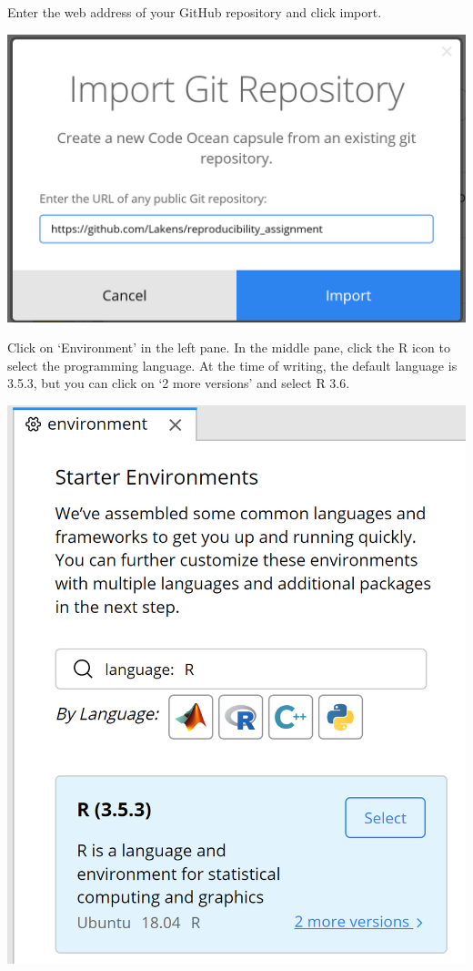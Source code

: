 \documentclass[
  oneside]{book}
\begin{document}
Enter the web address of your GitHub repository and click import.

\begin{center}\includegraphics[width=1\linewidth]{images/51f0dab67e96b317ef54a0affabe14d6} \end{center}

Click on `Environment' in the left pane. In the middle pane, click the R icon to
select the programming language. At the time of writing, the default language is
3.5.3, but you can click on `2 more versions' and select R 3.6.

\begin{center}\includegraphics[width=1\linewidth]{images/d6a90fd36fce0555b797e269cdd8c992} \end{center}
\end{document}
